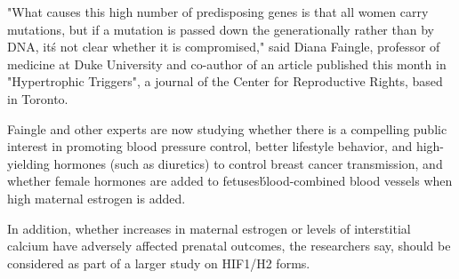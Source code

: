 \documentclass{article}
\begin{document}
"What causes this high number of predisposing genes is that all women carry mutations, but if a mutation is passed down the generationally rather than by DNA, it\'s not clear whether it is compromised," said Diana Faingle, professor of medicine at Duke University and co-author of an article published this month in "Hypertrophic Triggers", a journal of the Center for Reproductive Rights, based in Toronto.

Faingle and other experts are now studying whether there is a compelling public interest in promoting blood pressure control, better lifestyle behavior, and high-yielding hormones (such as diuretics) to control breast cancer transmission, and whether female hormones are added to fetuses\' blood-combined blood vessels when high maternal estrogen is added.

In addition, whether increases in maternal estrogen or levels of interstitial calcium have adversely affected prenatal outcomes, the researchers say, should be considered as part of a larger study on HIF1/H2 forms.
\end{document}
